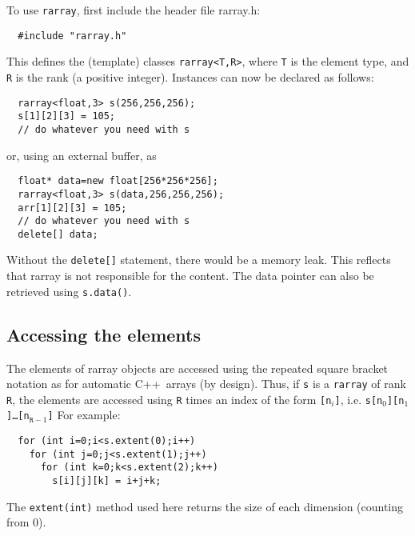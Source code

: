 \documentclass[12pt,twoside]{article}
\newcommand{\cxx}{C{++}}
\begin{document}
To use \texttt{rarray}, first include the header file rarray.h:
\begin{framed}\vspace{-14pt}%
\begin{verbatim}
  #include "rarray.h"
\end{verbatim}%
\vspace{-14pt}
\end{framed}
This defines the (template) classes \texttt{rarray{\tt<}T,R{\tt>}}, where
\texttt T is the element type, and \texttt R is the
rank (a positive integer).  Instances can now be
declared as follows:
\begin{framed}\vspace{-18pt}%
\begin{verbatim}
  rarray<float,3> s(256,256,256);
  s[1][2][3] = 105;
  // do whatever you need with s
\end{verbatim}%
\vspace{-14pt}
\end{framed}
or, using an external buffer, as
\begin{framed}\vspace{-18pt}%
\begin{verbatim}
  float* data=new float[256*256*256];  
  rarray<float,3> s(data,256,256,256);
  arr[1][2][3] = 105;
  // do whatever you need with s
  delete[] data;
\end{verbatim}%
\vspace{-14pt}
\end{framed}
Without the \texttt{delete[]} statement, there would be a memory leak. This reflects that rarray is not responsible
for the content. The data pointer can also be retrieved using
\texttt{s.data()}. 

\subsection{Accessing the elements}

The elements of rarray objects are accessed using the repeated square
bracket notation as for automatic \cxx\ arrays (by design). Thus, if \texttt{s} is a \texttt{rarray} of rank \texttt R, the elements are accessed using \texttt{R} times an index of the form \texttt{[n$_i$]}, i.e. \texttt{s[n$_0$][n$_1$]\dots[n$_{\texttt{R}-1}$]}
For example:\vspace{-9pt}
\begin{framed}\vspace{-18pt}%
\begin{verbatim}
  for (int i=0;i<s.extent(0);i++)
    for (int j=0;j<s.extent(1);j++)
      for (int k=0;k<s.extent(2);k++)
        s[i][j][k] = i+j+k;
\end{verbatim}%
\vspace{-12pt}
\end{framed}\vspace{-8pt}\noindent
The \texttt{extent(int)} method used here returns the size of each dimension (counting from 0).
\end{document}

